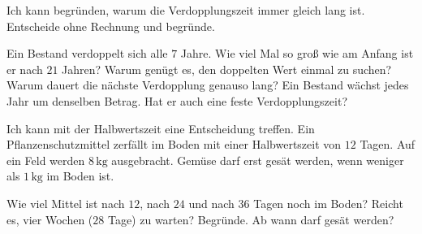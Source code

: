 \begin{aufgabe}{Ich kann begründen, warum die Verdopplungszeit immer gleich lang ist. Entscheide ohne Rechnung und begründe.}
\begin{teile}
\teil Ein Bestand verdoppelt sich alle $7$ Jahre. Wie viel Mal so groß wie am Anfang ist er nach $21$ Jahren?
\teil Warum genügt es, den doppelten Wert einmal zu suchen? Warum dauert die nächste Verdopplung genauso lang?
\teil Ein Bestand wächst jedes Jahr um denselben Betrag. Hat er auch eine feste Verdopplungszeit?
\end{teile}
\end{aufgabe}

\begin{aufgabe}{Ich kann mit der Halbwertszeit eine Entscheidung treffen. Ein Pflanzenschutzmittel zerfällt im Boden mit einer Halbwertszeit von $12$ Tagen. Auf ein Feld werden $8\,\text{kg}$ ausgebracht. Gemüse darf erst gesät werden, wenn weniger als $1\,\text{kg}$ im Boden ist.}
\begin{teile}
\teil Wie viel Mittel ist nach $12$, nach $24$ und nach $36$ Tagen noch im Boden?
\teil Reicht es, vier Wochen ($28$ Tage) zu warten? Begründe.
\teil Ab wann darf gesät werden?
\end{teile}
\end{aufgabe}
